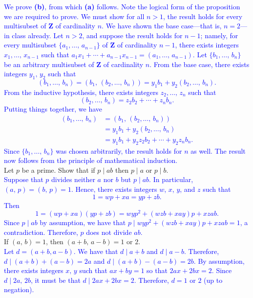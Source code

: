 \documentclass[a4paper,11pt]{article}
\theoremstyle{mythm}
\theoremstyle{mydef}
\newcommand{\blue}[1]{\textcolor{blue}{#1}}
\newcommand{\Z}{\mathbf{Z}}
\begin{document}
\blue{We prove {\bf (b)}, from which {\bf (a)} follows. Note the logical form of
the proposition we are required to prove. We must show for all $n>1$, the result
holds for every multisubset of $\Z$ of cardinality $n$. We have shown the base
case---that is, $n=2$---in class already. Let $n>2$, and suppose the result
holds for $n-1$; namely, for every multisubset $\{a_1,\dots,\,a_{n-1}\}$ of $\Z$
of cardinality $n-1$, there exists integers $x_1,\dots,\,x_{n-1}$ such that
$a_1x_1+\cdots+a_{n-1}x_{n-1}=(a_1,\dots,\,a_{n-1})$. Let $\{b_1,\dots,\,b_n\}$
be an arbitrary multisubset of $\Z$ of cardinality $n$. From the base case,
there exists integers $y_1,\,y_2$ such that
\[
  (b_1,\dots,\,b_n) = (b_1,\,(b_2,\dots,\,b_n)) = y_1b_1 + y_2(b_2,\dots,\,b_n).
\]
From the inductive hypothesis, there exists integers $z_2,\dots,\,z_n$ such that
\[
  (b_2,\dots,\,b_n) = z_2b_2+\cdots+z_nb_n.
\]
Putting things together, we have
\begin{align*}
  (b_1,\dots,\,b_n) &= (b_1,\,(b_2,\dots,\,b_n)) \\
                    &= y_1b_1+y_2(b_2,\dots,\,b_n) \\
                    &= y_1b_1+y_2z_2b_2+\cdots+y_2z_nb_n.
\end{align*}
Since $\{b_1,\dots,\,b_n\}$ was chosen arbitrarily, the result holds for $n$ as
well. The result now follows from the principle of mathematical induction.} \\

 Let $p$ be a prime. Show that if $p \mid ab$ then $p
\mid a$ or $p \mid b$. \\

\blue{Suppose that $p$ divides neither $a$ nor $b$ but $p \mid ab$. In
particular, $(a,\,p)=(b,\,p)=1$. Hence, there exists integers $w$, $x$, $y$, and
$z$ such that
  \[
    1 = wp+xa = yp+zb.
  \]
  Then
  \[
    1=(wp+xa)(yp+zb) = wyp^2+(wzb+xay)p+xzab.
  \]
  Since $p \mid ab$ by assumption, we have that $p \mid
  wyp^2+(wzb+xay)p+xzab=1$, a contradiction. Therefore, $p$ does not divide
  $ab$.} \\

 If $(a,\,b)=1$, then $(a+b,\,a-b)=1\text{ or }2$. \\

\blue{Let $d=(a+b,a-b)$. We have that $d \mid a+b$ and $d \mid a-b$. Therefore,
  $d \mid (a+b)+(a-b)=2a$ and $d \mid (a+b)-(a-b)=2b$. By assumption, there
  exists integers $x,\,y$ such that $ax+by=1$ so that $2ax+2bx=2$. Since $d \mid
  2a,\,2b$, it must be that $d \mid 2ax+2bx=2$. Therefore, $d=1\text{ or }2$ (up
  to negation).} \\
\end{document}

